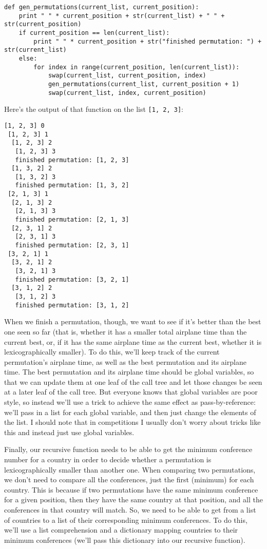 \begin{verbatim}
def gen_permutations(current_list, current_position):
    print " " * current_position + str(current_list) + " " + str(current_position)
    if current_position == len(current_list):
        print " " * current_position + str("finished permutation: ") + str(current_list)
    else:
        for index in range(current_position, len(current_list)):
            swap(current_list, current_position, index)
            gen_permutations(current_list, current_position + 1)
            swap(current_list, index, current_position)
\end{verbatim}

Here's the output of that function on the list \texttt{[1, 2, 3]}:

\begin{verbatim}
[1, 2, 3] 0
 [1, 2, 3] 1
  [1, 2, 3] 2
   [1, 2, 3] 3
   finished permutation: [1, 2, 3]
  [1, 3, 2] 2
   [1, 3, 2] 3
   finished permutation: [1, 3, 2]
 [2, 1, 3] 1
  [2, 1, 3] 2
   [2, 1, 3] 3
   finished permutation: [2, 1, 3]
  [2, 3, 1] 2
   [2, 3, 1] 3
   finished permutation: [2, 3, 1]
 [3, 2, 1] 1
  [3, 2, 1] 2
   [3, 2, 1] 3
   finished permutation: [3, 2, 1]
  [3, 1, 2] 2
   [3, 1, 2] 3
   finished permutation: [3, 1, 2]
\end{verbatim}

When we finish a permutation, though, we want to see if it's better than the best one seen so far (that is, whether it has a smaller total airplane time than the current best, or, if it has the same airplane time as the current best, whether it is lexicographically smaller). To do this, we'll keep track of the current permutation's airplane time, as well as the best permutation and its airplane time. The best permutation and its airplane time should be global variables, so that we can update them at one leaf of the call tree and let those changes be seen at a later leaf of the call tree. But everyone knows that global variables are poor style, so instead we'll use a trick to achieve the same effect as pass-by-reference: we'll pass in a list for each global variable, and then just change the elements of the list. I should note that in competitions I usually don't worry about tricks like this and instead just use global variables.

Finally, our recursive function needs to be able to get the minimum conference number for a country in order to decide whether a permutation is lexicographically smaller than another one. When comparing two permutations, we don't need to compare all the conferences, just the first (minimum) for each country. This is because if two permutations have the same minimum conference for a given position, then they have the same country at that position, and all the conferences in that country will match. So, we need to be able to get from a list of countries to a list of their corresponding minimum conferences. To do this, we'll use a list comprehension and a dictionary mapping countries to their minimum conferences (we'll pass this dictionary into our recursive function).

